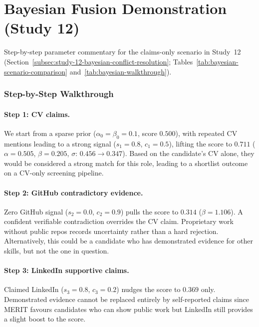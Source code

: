 \chapter{Bayesian Fusion Demonstration (Study 12)}
\label{appendix:bayesian-fusion-charts}

Step-by-step parameter commentary for the claims-only scenario in Study~12 (Section~\ref{subsec:study-12-bayesian-conflict-resolution}; Tables~\ref{tab:bayesian-scenario-comparison} and~\ref{tab:bayesian-walkthrough}).

\subsection*{Step-by-Step Walkthrough}
\label{appendix:bayesian-fusion-walkthrough}

\subsubsection{Step 1: CV claims.}
We start from a sparse prior ($\alpha_0 = \beta_0 = 0.1$, score $0.500$), with repeated CV 
mentions leading to a strong signal ($s_1 = 0.8$, $c_1 = 0.5$), lifting the score to $0.711$ ($\alpha = 0.505$, $\beta = 0.205$, 
$\sigma$: $0.456 \rightarrow 0.347$). Based on the candidate's CV alone, they would be considered a strong match for this role,
leading to a shortlist outcome on a CV-only screening pipeline.

\subsubsection{Step 2: GitHub contradictory evidence.}
Zero GitHub signal ($s_2 = 0.0$, $c_2 = 0.9$) pulls the score to $0.314$ 
($\beta = 1.106$). A confident verifiable contradiction overrides the CV claim. Proprietary work without public 
repos records uncertainty rather than a hard rejection. Alternatively, this could be a candidate who has demonstrated evidence
for other skills, but not the one in question.

\subsubsection{Step 3: LinkedIn supportive claims.}
Claimed LinkedIn ($s_3 = 0.8$, $c_3 = 0.2$) nudges the score to $0.369$ 
only. Demonstrated evidence cannot be replaced entirely by self-reported claims since MERIT favours candidates who can show public work
but LinkedIn still provides a slight boost to the score.


